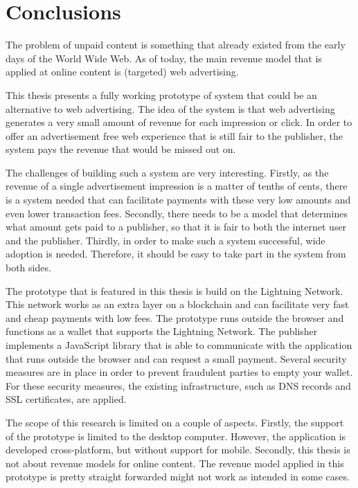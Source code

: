 \chapter{Conclusions}
\label{cha:conclusion}

The problem of unpaid content is something that already existed from the early days of the World Wide Web. As of today, the main revenue model that is applied at online content is (targeted) web advertising.


This thesis presents a fully working prototype of system that could be an alternative to web advertising. The idea of the system is that web advertising generates a very small amount of revenue for each impression or click. In order to offer an advertisement free web experience that is still fair to the publisher, the system pays the revenue that would be missed out on. 

The challenges of building such a system are very interesting. Firstly, as the revenue of a single advertisement impression is a matter of tenths of cents, there is a system needed that can facilitate payments with these very low amounts and even lower transaction fees. Secondly, there needs to be a model that determines what amount gets paid to a publisher, so that it is fair to both the internet user and the publisher. Thirdly, in order to make such a system successful, wide adoption is needed. Therefore, it should be easy to take part in the system from both sides.

The prototype that is featured in this thesis is build on the Lightning Network. This network works as an extra layer on a blockchain and can facilitate very fast and cheap payments with low fees. The prototype runs outside the browser and functions as a wallet that supports the Lightning Network. The publisher implements a JavaScript library that is able to communicate with the application that runs outside the browser and can request a small payment. Several security measures are in place in order to prevent fraudulent parties to empty your wallet. For these security measures, the existing infrastructure, such as DNS records and SSL certificates, are applied. 

The scope of this research is limited on a couple of aspects. Firstly, the support of the prototype is limited to the desktop computer. However, the application is developed cross-platform, but without support for mobile. Secondly, this thesis is not about revenue models for online content. The revenue model applied in this prototype is pretty straight forwarded might not work as intended in some cases. 

